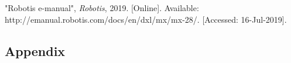\documentclass[letterpaper,12pt]{article}
\begin{document}
\begin{thebibliography}{99}
"Robotis e-manual", \textit{Robotis}, 2019. [Online]. Available: http://emanual.robotis.com/docs/en/dxl/mx/mx-28/. [Accessed: 16-Jul-2019].
%
%
%
%
%
%
%
%
%
%
%
%
%
%

\end{thebibliography}

\begin{appendices}
\section{Appendix}
\end{appendices}
\end{document}
